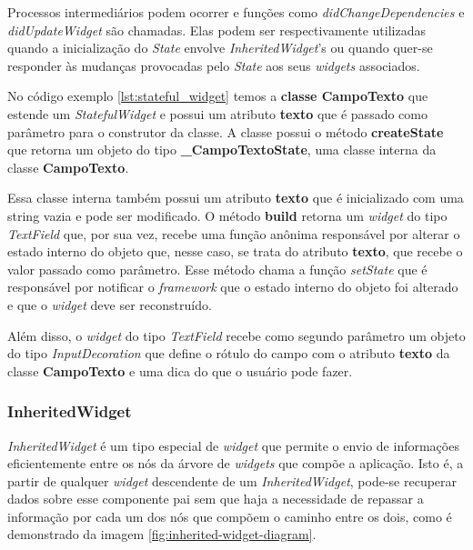 Processos intermediários podem ocorrer e funções como \textit{didChangeDependencies} e \textit{didUpdateWidget} são chamadas. Elas podem ser respectivamente utilizadas quando a inicialização do \textit{State} envolve \textit{InheritedWidget}'s ou quando quer-se responder às mudanças provocadas pelo \textit{State} aos seus \textit{widgets} associados.

No código exemplo \ref{lst:stateful_widget} temos a \textbf{classe CampoTexto} que estende um \textit{StatefulWidget} e possui um atributo \textbf{texto} que é passado como parâmetro para o construtor da classe. A classe possui o método \textbf{createState} que retorna um objeto do tipo \textbf{\_CampoTextoState}, uma classe interna da classe \textbf{CampoTexto}.

Essa classe interna também possui um atributo \textbf{texto} que é inicializado com uma string vazia e pode ser modificado. O método \textbf{build} retorna um \textit{widget} do tipo \textit{TextField} que, por sua vez, recebe uma função anônima responsável por alterar o estado interno do objeto que, nesse caso, se trata do atributo \textbf{texto}, que recebe o valor passado como parâmetro. Esse método chama a função \textit{setState} que é responsável por notificar o \textit{framework} que o estado interno do objeto foi alterado e que o \textit{widget} deve ser reconstruído.

Além disso, o \textit{widget} do tipo \textit{TextField} recebe como segundo parâmetro um objeto do tipo \textit{InputDecoration} que define o rótulo do campo com o atributo \textbf{texto} da classe \textbf{CampoTexto} e uma dica do que o usuário pode fazer.

\subsubsection{InheritedWidget}
\label{cap2:SubSubSec:InheritedWidget}
\textit{InheritedWidget} é um tipo especial de \textit{widget} que permite o envio de informações eficientemente entre os nós da árvore de \textit{widgets} que compõe a aplicação. Isto é, a partir de qualquer \textit{widget} descendente de um \textit{InheritedWidget}, pode-se recuperar dados sobre esse componente pai sem que haja a necessidade de repassar a informação por cada um dos nós que compõem o caminho entre os dois, como é demonstrado da imagem \ref{fig:inherited-widget-diagram}.

